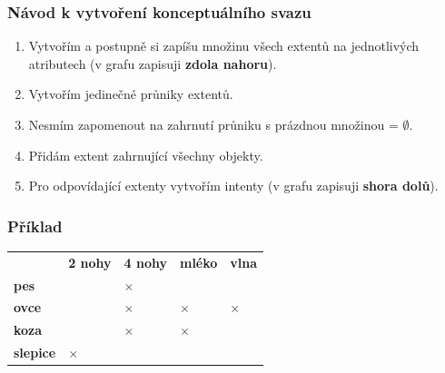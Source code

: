 \subsubsection{Návod k vytvoření konceptuálního svazu}
\begin{enumerate}
\item Vytvořím a postupně si zapíšu množinu všech extentů na jednotlivých atributech (v grafu zapisuji \textbf{zdola nahoru}).
\item Vytvořím jedinečné průniky extentů.
\item Nesmím zapomenout na zahrnutí průniku s prázdnou množinou = $\emptyset$.
\item Přidám extent zahrnující všechny objekty.
\item Pro odpovídající extenty vytvořím intenty (v grafu zapisuji \textbf{shora dolů}).
\end{enumerate}

\subsubsection*{Příklad}
\begin{table}[H]
	\centering
	\begin{tabular}{l|l|l|l|l}
		& \textbf{2 nohy} & \textbf{4 nohy} & \textbf{mléko} & \textbf{vlna} \\\hhline
		\textbf{pes}     &                 &          $\times$        &               &               \\
		\textbf{ovce}    &                 &         $\times$              &       $\times$                &         $\times$       \\
		\textbf{koza}    &                 &          $\times$            &     $\times$               &               \\
		\textbf{slepice} &         $\times$         &                     &                       &               \\ 
	\end{tabular}
\end{table}

